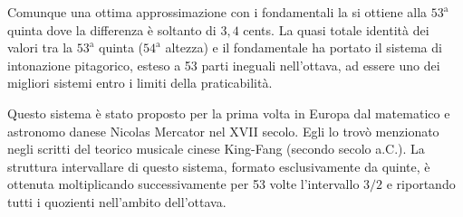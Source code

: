 Comunque una ottima approssimazione con i fondamentali la si ottiene alla
$53^{\text{a}}$ quinta dove la differenza è soltanto di $3{,}4$ cents. La quasi
totale identità dei valori tra la $53^{\text{a}}$ quinta ($54^{\text{a}}$
altezza) e il fondamentale ha portato il sistema di intonazione pitagorico,
esteso a 53 parti ineguali nell'ottava, ad essere uno dei migliori sistemi entro
i limiti della praticabilità.

\newpage

Questo sistema è stato proposto per la prima volta in Europa dal matematico e
astronomo danese Nicolas Mercator nel XVII secolo. Egli lo trovò menzionato
negli scritti del teorico musicale cinese King-Fang (secondo secolo a.C.). La
struttura intervallare di questo sistema, formato esclusivamente da quinte, è
ottenuta moltiplicando successivamente per 53 volte l'intervallo $3/2$ e
riportando tutti i quozienti nell'ambito dell'ottava.

